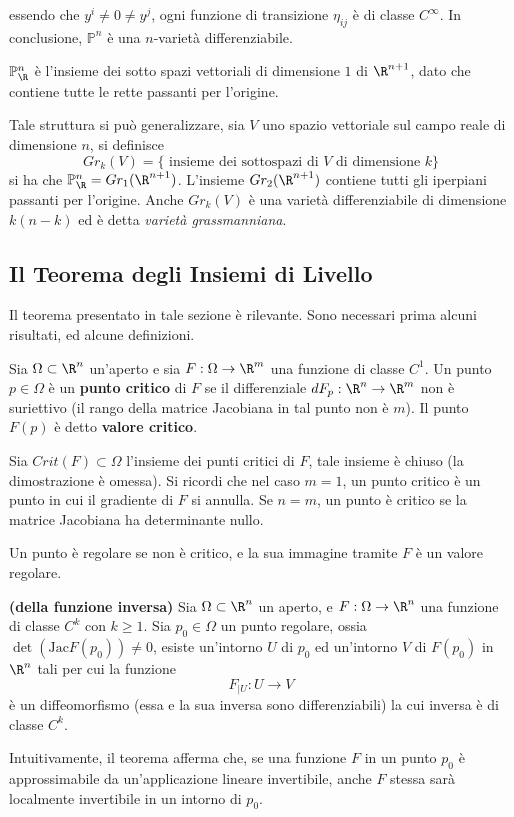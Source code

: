 \documentclass[10pt, letterpaper]{report}
\begin{document}
essendo che $y^i\ne 0 \ne y^j$, ogni funzione di transizione $\eta_{ij}$ è di classe $C^\infty$. In conclusione, $\mathbb P^n$ è una $n$-varietà differenziabile.\begin{osservazione}
    $\mathbb P^n_\R$ è l'insieme dei sotto spazi vettoriali di dimensione $1$ di $\R^{n+1}$, dato che contiene tutte le rette passanti per l'origine.
\end{osservazione}
Tale struttura si può generalizzare, sia $V$ uno spazio vettoriale sul campo reale di dimensione $n$, si definisce\begin{equation}
    Gr_k(V)=\{\text{ insieme dei sottospazi di }V\text{ di dimensione }k\}
\end{equation}
si ha che $\mathbb P^n_\R=Gr_{1}(\R^{n+1})$. L'insieme $Gr_{2}(\R^{n+1})$ contiene tutti gli iperpiani passanti per l'origine. Anche $Gr_k(V)$ è una varietà differenziabile di dimensione $k(n-k)$ ed è detta \textit{varietà grassmanniana}.
\subsection{Il Teorema degli Insiemi di Livello}
Il teorema presentato in tale sezione è rilevante. Sono necessari prima alcuni risultati, ed alcune definizioni.\begin{definizione}
    Sia $\Omega\subset\R^n$ un'aperto e sia $F:\Omega\rightarrow\R^m$ una funzione di classe $C^1$. Un punto $p\in\Omega$ è un \textbf{punto critico} di $F$ se il differenziale $dF_p:\R^n\rightarrow\R^m$ non è suriettivo (il rango della matrice Jacobiana in tal punto non è $m$). Il punto $F(p)$ è detto \textbf{valore critico}.
\end{definizione}
Sia $Crit(F)\subset\Omega$ l'insieme dei punti critici di $F$, tale insieme è chiuso (la dimostrazione è omessa). Si ricordi che nel caso $m=1$, un punto critico è un punto in cui il gradiente di $F$ si annulla. Se $n=m$, un punto è critico se la matrice Jacobiana ha determinante nullo.

Un punto è regolare se non è critico, e la sua immagine tramite $F$ è un valore regolare.
\begin{teorema}\label{teo:func_inv}\textbf{(della funzione inversa)}
Sia $\Omega\subset\R^n$ un aperto, e $F:\Omega\rightarrow\R^n$ una funzione di classe $C^k$ con $k\ge 1$. Sia $p_0\in\Omega$ un punto regolare, ossia $\det(\text{Jac}F(p_0))\ne 0$, esiste un'intorno $U$ di $p_0$ ed un'intorno $V$ di $F(p_0)$ in $\R^n$ tali per cui la funzione \begin{equation}
    F_{|U}:U\rightarrow V 
\end{equation}
è un diffeomorfismo (essa e la sua inversa sono differenziabili) la cui inversa è di classe $C^k$.
\end{teorema}
Intuitivamente, il teorema afferma che, se una funzione $F$ in un punto $p_0$ è approssimabile da un'applicazione lineare invertibile, anche $F$ stessa sarà localmente invertibile in un intorno di $p_0$.\bigskip
\end{document}
